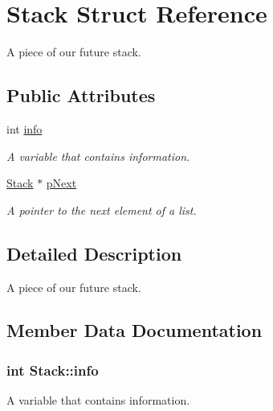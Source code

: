 \hypertarget{struct_stack}{}\section{Stack Struct Reference}
\label{struct_stack}


A piece of our future stack.  


\subsection*{Public Attributes}
\begin{DoxyCompactItemize}
\item 
int \hyperlink{struct_stack_ad00891d3a42fab10c4ee50fbc960fc8c}{info}
\begin{DoxyCompactList}\small\item\em A variable that contains information. \end{DoxyCompactList}\item 
\hyperlink{struct_stack}{Stack} $\ast$ \hyperlink{struct_stack_ad214ffe54ccc5862f3f6d57ea920f0bd}{p\+Next}
\begin{DoxyCompactList}\small\item\em A pointer to the next element of a list. \end{DoxyCompactList}\end{DoxyCompactItemize}


\subsection{Detailed Description}
A piece of our future stack. 

\subsection{Member Data Documentation}
\hypertarget{struct_stack_ad00891d3a42fab10c4ee50fbc960fc8c}{}
\subsubsection[{info}]{\setlength{\rightskip}{0pt plus 5cm}int Stack\+::info}\label{struct_stack_ad00891d3a42fab10c4ee50fbc960fc8c}


A variable that contains information. 

\hypertarget{struct_stack_ad214ffe54ccc5862f3f6d57ea920f0bd}{}

